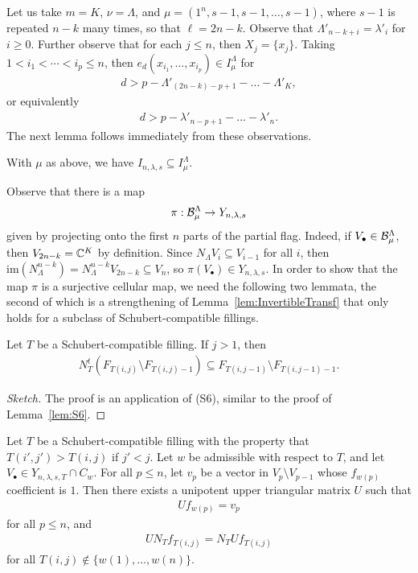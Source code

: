 \documentclass[12pt]{amsart}
\newcommand{\la}{\lambda}
\newcommand{\im}{\mathrm{im}}
\begin{document}
Let us take $m = K$, $\nu = \Lambda$, and $\mu = (1^n,s-1,s-1,\dots, s-1)$, where $s-1$ is repeated $n-k$ many times, so that $\ell = 2n-k$. Observe that $\Lambda'_{n-k+i} = \la'_i$ for $i\geq 0$. Further observe that for each $j\leq n$, then $X_j = \{x_j\}$. Taking $1<i_1<\cdots <i_p \leq n$, then $e_d(x_{i_1},\dots, x_{i_p})\in I_\mu^\Lambda$ for
\begin{align}
d > p-\Lambda'_{(2n-k)-p+1} - \dots -\Lambda'_K,
\end{align}
or equivalently
\begin{align}
d > p-\la'_{n-p+1} - \dots - \la'_n.
\end{align}
The next lemma follows immediately from these observations.
\begin{lemma}\label{lem:IdealContainment}
With $\mu$ as above, we have $I_{n,\la,s} \subseteq I_\mu^\Lambda$.
\end{lemma}



Observe that there is a map
\begin{align}
\pi : \cB_\mu^\Lambda \rightarrow Y_{n,\la,s}
\end{align}
given by projecting onto the first $n$ parts of the partial flag. Indeed, if $V_\bullet \in \mathcal{B}_\mu^\Lambda$, then $V_{2n-k} = \mathbb{C}^K$ by definition. Since $N_\Lambda V_i\subseteq V_{i-1}$ for all $i$, then $\im(N_\Lambda^{n-k}) = N_\Lambda^{n-k}V_{2n-k} \subseteq V_n$, so $\pi(V_\bullet) \in Y_{n,\la,s}$. 
In order to show that the map $\pi$ is a surjective cellular map, we need the following two lemmata, the second of which is a strengthening of Lemma~\ref{lem:InvertibleTransf} that only holds for a subclass of Schubert-compatible fillings.





\begin{lemma}\label{lem:LeadingTerm}
Let $T$ be a Schubert-compatible filling. If $j>1$, then
\begin{align}
    N^t_T(F_{T(i,j)}\setminus F_{T(i,j)-1})\subseteq F_{T(i,j-1)}\setminus F_{T(i,j-1)-1}.
\end{align} 
\end{lemma}
\begin{proof}[Sketch]
The proof is an application of (S6), similar to the proof of Lemma~\ref{lem:S6}.
\end{proof}


\begin{lemma}\label{lem:TechnicalLemmaUnipotent}
Let $T$ be a Schubert-compatible filling with the property that $T(i',j')>T(i,j)$ if $j'<j$. Let $w$ be admissible with respect to $T$, and let $V_\bullet\in Y_{n,\la,s,T}\cap C_w$. For all $p\leq n$, let $v_p$ be a vector in $V_p\setminus V_{p-1}$ whose $f_{w(p)}$ coefficient is $1$. Then there exists a unipotent upper triangular matrix $U$ such that 
\begin{align}\label{eq:UnipotentEq1}
U f_{w(p)} = v_p
\end{align}
for all $p\leq n$, and
\begin{align}\label{eq:UnipotentEq2}
UN_T f_{T(i,j)} = N_TU f_{T(i,j)}
\end{align}
for all $T(i,j) \notin\{w(1),\dots, w(n)\}$.
\end{lemma}
\end{document}
